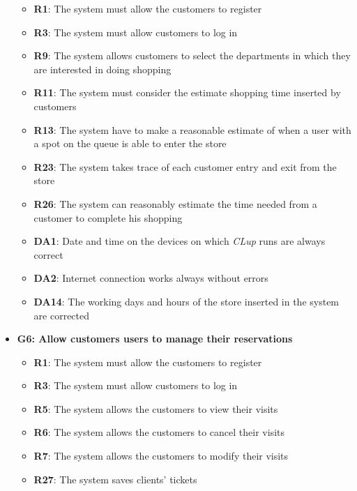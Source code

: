 \documentclass{article}
\begin{document}
\begin{itemize}
					\begin{itemize}
						
						\item {\bfseries R1}: The system must allow the customers to register
						\item {\bfseries R3}: The system must allow customers to log in
						\item {\bfseries R9}: The system allows customers to select the departments in which they are interested in doing shopping
						\item {\bfseries R11}: The system must consider the estimate shopping time inserted by customers
						\item {\bfseries R13}: The system have to make a reasonable estimate of when a user with a spot on the queue is able to enter the store
						\item {\bfseries R23}: The system takes trace of each customer entry and exit from the store
						\item {\bfseries R26}: The system can reasonably estimate the time needed from a customer to complete his shopping \\
						
						\item {\bfseries DA1}: Date and time on the devices on which \emph{CLup} runs are always correct
						\item {\bfseries DA2}: Internet connection works always without errors
						\item {\bfseries DA14}: The working days and hours of the store inserted in the system are corrected
						
					\end{itemize}

				\item {\bfseries G6: Allow customers users to manage their reservations}	

					\begin{itemize}
						\item {\bfseries R1}: The system must allow the customers to register
						\item {\bfseries R3}: The system must allow customers to log in
						\item {\bfseries R5}: The system allows the customers to view their visits
						\item {\bfseries R6}: The system allows the customers to cancel their visits
						\item {\bfseries R7}: The system allows the customers to modify their visits
						\item {\bfseries R27}: The system saves clients' tickets \\
		

\end{itemize}
\end{itemize}
\end{document}
